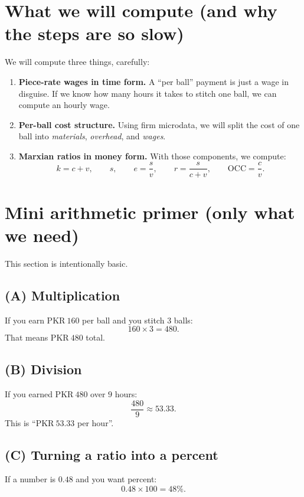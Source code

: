 \documentclass[11pt]{article}
\newcommand{\PKR}{\text{PKR}}
\newcommand{\cconst}{c} %
\newcommand{\vvar}{v}   %
\newcommand{\splus}{s}  %
\newcommand{\kcost}{k}  %
\newcommand{\eRate}{e}  %
\newcommand{\pRate}{r}  %
\newcommand{\OCC}{\mathrm{OCC}} %
\begin{document}
\section{What we will compute (and why the steps are so slow)}
We will compute three things, carefully:
\begin{enumerate}[leftmargin=*]
\item \textbf{Piece-rate wages in time form.} A ``per ball'' payment is just a wage in disguise. If we know how many hours it takes to stitch one ball, we can compute an hourly wage.
\item \textbf{Per-ball cost structure.} Using firm microdata, we will split the cost of one ball into \emph{materials}, \emph{overhead}, and \emph{wages}.
\item \textbf{Marxian ratios in money form.} With those components, we compute:
  \[
    \kcost=\cconst+\vvar,\qquad
    \splus,\qquad
    \eRate=\frac{\splus}{\vvar},\qquad
    \pRate=\frac{\splus}{\cconst+\vvar},\qquad
    \OCC=\frac{\cconst}{\vvar}.
  \]
\end{enumerate}

\section{Mini arithmetic primer (only what we need)}
This section is intentionally basic.

\subsection*{(A) Multiplication}
If you earn \(\PKR{}~160\) per ball and you stitch \(3\) balls:
\[
  160 \times 3 = 480.
\]
That means \(\PKR{}~480\) total.

\subsection*{(B) Division}
If you earned \(\PKR{}~480\) over \(9\) hours:
\[
  \frac{480}{9} \approx 53.33.
\]
This is ``\(\PKR{}~53.33\) per hour''.

\subsection*{(C) Turning a ratio into a percent}
If a number is \(0.48\) and you want percent:
\[
  0.48 \times 100 = 48\%.
\]
\end{document}
